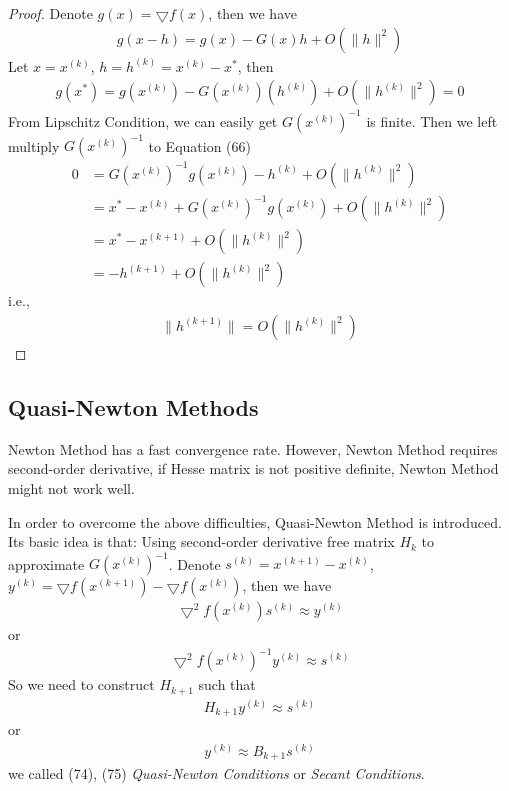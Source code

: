 \documentclass[runningheads]{llncs}
\begin{document}
\begin{proof}
    Denote $g(x) = \bigtriangledown f(x)$, then we have
    \begin{align}
        g(x - h) = g(x) - G(x)h + O(\parallel h \parallel^2)
    \end{align}
    Let $x = x^{(k)}$, $h = h^{(k)} = x^{(k)} - x^*$, then
    \begin{align}
        g(x^*) = g(x^{(k)}) - G(x^{(k)})(h^{(k)})
        + O(\parallel h^{(k)} \parallel^2) = 0
    \end{align}
    From Lipschitz Condition, we can easily get 
    $G(x^{(k)})^{-1}$ is finite. Then we left multiply
    $G(x^{(k)})^{-1}$ to Equation (66)
    \begin{align}
        0 &= G(x^{(k)})^{-1} g(x^{(k)}) - h^{(k)}
         + O(\parallel h^{(k)} \parallel^2) \\
        &= x^* - x^{(k)} + G(x^{(k)})^{-1} g(x^{(k)})
         + O(\parallel h^{(k)} \parallel^2) \\
         &= x^* - x^{(k+1)}
         + O(\parallel h^{(k)} \parallel^2) \\
         &= - h^{(k+1)} + O(\parallel h^{(k)} \parallel^2)
    \end{align}
    i.e.,
    \begin{align}
        \parallel h^{(k+1)} \parallel = O(\parallel h^{(k)} \parallel^2)
    \end{align}
\end{proof}

\subsection{Quasi-Newton Methods}
Newton Method has a fast convergence rate.
However, Newton Method requires second-order derivative,
if Hesse matrix is not positive definite, Newton Method
might not work well.
\par
In order to overcome the above difficulties,
Quasi-Newton Method is introduced.
Its basic idea is that:
Using second-order derivative free matrix $H_k$
to approximate $G(x^{(k)})^{-1}$.
Denote $s^{(k)} = x^{(k+1)} - x^{(k)}$,
$y^{(k)} = \bigtriangledown f(x^{(k+1)}) - \bigtriangledown f(x^{(k)})$,
then we have
\begin{align}
    \bigtriangledown^2 f(x^{(k)}) s^{(k)} \approx y^{(k)}
\end{align}
or
\begin{align}
    \bigtriangledown^2 f(x^{(k)})^{-1} y^{(k)} \approx s^{(k)}
\end{align}
So we need to construct $H_{k+1}$ such that
\begin{align}
    H_{k+1} y^{(k)} \approx s^{(k)}
\end{align}
or
\begin{align}
    y^{(k)} \approx B_{k+1} s^{(k)}
\end{align}
we called (74), (75) \textit{Quasi-Newton Conditions}
or \textit{Secant Conditions}.
\end{document}

